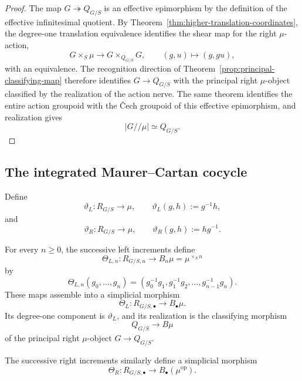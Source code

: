 \begin{proof}
The map $G\twoheadrightarrow Q_{G/S}$ is an effective epimorphism by the
definition of the effective infinitesimal quotient.  By
Theorem~\ref{thm:higher-translation-coordinates}, the degree-one translation
equivalence identifies the shear map for the right $\mu$-action,
\[
    G\times_S\mu
    \longrightarrow
    G\times_{Q_{G/S}}G,
    \qquad
    (g,u)\longmapsto(g,gu),
\]
with an equivalence.  The recognition direction of
Theorem~\ref{prop:principal-classifying-map} therefore identifies
$G\to Q_{G/S}$ with the principal right $\mu$-object classified by the
realization of the action nerve.  The same theorem identifies
the entire action groupoid with the \v{C}ech groupoid of this effective
epimorphism, and realization gives
\[
    |G/\!/\mu|\simeq Q_{G/S}.
\]
\end{proof}

\subsection{The integrated Maurer--Cartan cocycle}

\begin{definition}
\label{def:formal-mc-projections}
Define
\[
    \vartheta_L:
    R_{G/S}\to\mu,
    \qquad
    \vartheta_L(g,h):=g^{-1}h,
\]
and
\[
    \vartheta_R:
    R_{G/S}\to\mu,
    \qquad
    \vartheta_R(g,h):=hg^{-1}.
\]
\end{definition}

\begin{theorem}
\label{thm:integrated-mc-cocycle}
For every $n\geq0$, the successive left increments define
\[
    \Theta_{L,n}:
    R_{G/S,n}\longrightarrow B_n\mu=\mu^{\times_Sn}
\]
by
\[
    \Theta_{L,n}(g_0,\ldots,g_n)
    =
    \left(
        g_0^{-1}g_1,
        g_1^{-1}g_2,
        \ldots,
        g_{n-1}^{-1}g_n
    \right).
\]
These maps assemble into a simplicial morphism
\[
    \Theta_L:
    R_{G/S,\bullet}\longrightarrow B_\bullet\mu.
\]
Its degree-one component is $\vartheta_L$, and its realization is the
classifying morphism
\[
    Q_{G/S}\longrightarrow B\mu
\]
of the principal right $\mu$-object $G\to Q_{G/S}$.

The successive right increments similarly define a simplicial morphism
\[
    \Theta_R:
    R_{G/S,\bullet}
    \longrightarrow
    B_\bullet(\mu^{\mathrm{op}}).
\]
\end{theorem}

